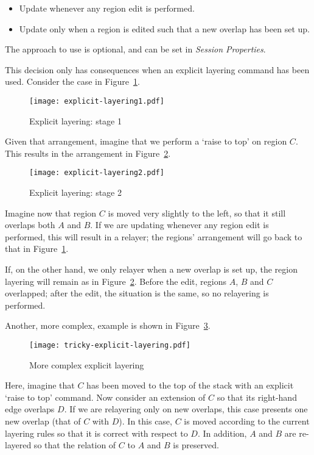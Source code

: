 \documentclass{article}
\begin{document}
\begin{itemize}
\item Update whenever any region edit is performed.
\item Update only when a region is edited such that a new overlap has been set up.
\end{itemize}

The approach to use is optional, and can be set in \emph{Session Properties}.

This decision only has consequences when an explicit layering command has
been used.  Consider the case in Figure~\ref{fig:explicit-layering1}.

\begin{figure}[ht]
\begin{center}
\texttt{[image: explicit-layering1.pdf]}
\end{center}
\caption{Explicit layering: stage 1}
\label{fig:explicit-layering1}
\end{figure}

Given that arrangement, imagine that we perform a `raise to top' on region $C$.
This results in the arrangement in Figure~\ref{fig:explicit-layering2}.

\begin{figure}[ht]
\begin{center}
\texttt{[image: explicit-layering2.pdf]}
\end{center}
\caption{Explicit layering: stage 2}
\label{fig:explicit-layering2}
\end{figure}

Imagine now that region $C$ is moved very slightly to the left, so
that it still overlaps both $A$ and $B$.  If we are updating whenever
any region edit is performed, this will result in a relayer; the
regions' arrangement will go back to that in
Figure~\ref{fig:explicit-layering1}.

If, on the other hand, we only relayer when a new overlap is set up,
the region layering will remain as in
Figure~\ref{fig:explicit-layering2}.  Before the edit, regions $A$,
$B$ and $C$ overlapped; after the edit, the situation is the same, so
no relayering is performed.

Another, more complex, example is shown in Figure~\ref{fig:tricky-explicit-layering}.

\begin{figure}[ht]
\begin{center}
\texttt{[image: tricky-explicit-layering.pdf]}
\end{center}
\caption{More complex explicit layering}
\label{fig:tricky-explicit-layering}
\end{figure}


Here, imagine that $C$ has been moved to the top of the stack with an explicit
`raise to top' command.  Now consider an extension of $C$ so that its
right-hand edge overlaps $D$.  If we are relayering only on new overlaps, this
case presents one new overlap (that of $C$ with $D$).  In this case, $C$ is
moved according to the current layering rules so that it is correct with
respect to $D$.  In addition, $A$ and $B$ are re-layered so that the relation
of $C$ to $A$ and $B$ is preserved.
\end{document}
